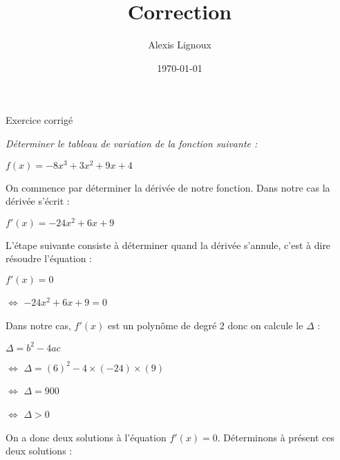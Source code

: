 \documentclass[
  12pt,
]{article}
\title{Correction}
\author{Alexis Lignoux}
\date{\today}
\begin{document}
\maketitle

\begin{center}

{\LARGE Exercice corrigé}

\end{center}

\vspace{1.5cm}

\normalsize

\textit{Déterminer le tableau de variation de la fonction suivante :}

\begin{center}
\large
$f(x)=-8x^3+3x^2+9x+4$
\end{center}
\vspace{1.2cm}
\normalsize

On commence par déterminer la dérivée de notre fonction. Dans notre cas
la dérivée s'écrit :

\begin{center}

        \large
$f'(x)=-24x^2+6x+9$
\end{center}
\bigskip
\normalsize

L'étape suivante consiste à déterminer quand la dérivée s'annule, c'est
à dire résoudre l'équation :

\begin{center}
\large
$f'(x)=0$

$\Leftrightarrow$  $-24x^2+6x+9=0$

\end{center}
\smallskip
\normalsize

Dans notre cas, \(f'(x)\) est un polynôme de degré \(2\) donc on calcule
le \(\Delta\) :

\large

\phantom{$\Rightarrow$} \(\Delta=b^2-4ac\)

\(\Leftrightarrow\) \(\Delta=(6)^2-4\times(-24)\times(9)\)

\(\Leftrightarrow\) \(\Delta=900\)

\(\Leftrightarrow\) \(\Delta>0\)

\smallskip

\normalsize

On a donc deux solutions à l'équation \(f'(x)=0\). Déterminons à présent
ces deux solutions :

\large
\end{document}
